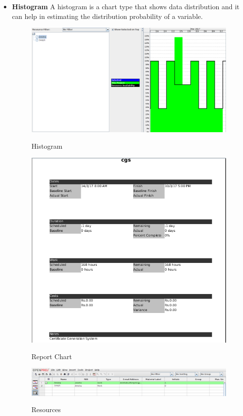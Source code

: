 \begin{itemize}
\item \textbf{Histogram }
A histogram is a chart type that shows data distribution and it can help in estimating the distribution probability of a variable.

\begin{figure}[!ht]
\centering
\includegraphics[width=0.8\linewidth]{input/images/am_histogram.png}
\label{fig:image1}
\caption{Histogram}
\end{figure}



\begin{figure}[!ht]
\centering
\includegraphics[width=0.8\linewidth]{input/images/am_reports.png}
\label{fig:image1}
\caption{Report Chart}
\end{figure}


\begin{figure}[!ht]
\centering
\includegraphics[width=1\linewidth]{input/images/am_resources.png}
\label{fig:image1}
\caption{Resources}
\end{figure}



\end{itemize}
